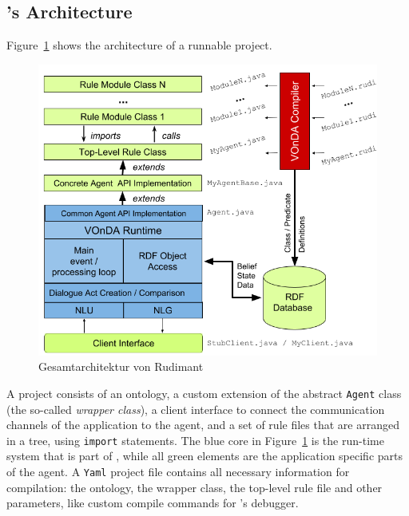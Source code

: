 \subsection{\vonda's Architecture}

Figure~\ref{fig:architecture} shows the architecture of a runnable \vonda project.


\begin{figure}[htbp]
  \centering
  \includegraphics[width=.8\textwidth]{VOnDAStructureRot2.png}
  \caption{Gesamtarchitektur von Rudimant}
  \label{fig:architecture}
\end{figure}


A \vonda project consists of an ontology, a custom extension of the abstract
\texttt{Agent} class (the so-called \emph{wrapper class}), a client interface
to connect the communication channels of the application to the agent, and a
set of rule files that are arranged in a tree, using \texttt{import}
statements. The blue core in Figure~\ref{fig:architecture} is the run-time system that
is part of \vonda, while all green elements are the application specific parts
of the agent. A \texttt{Yaml} project file contains all necessary information
for compilation: the ontology, the wrapper class, the top-level rule file and
other parameters, like custom compile commands for \vonda's debugger.

